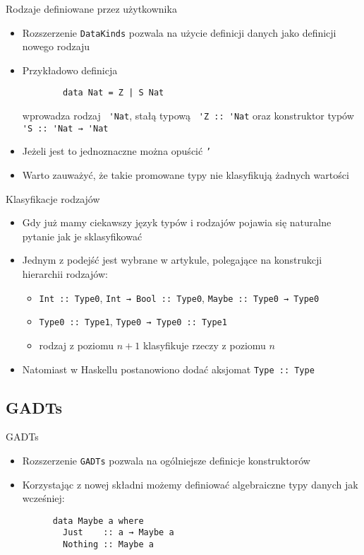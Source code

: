 \documentclass{beamer}
\begin{document}
\begin{frame}[fragile]{Rodzaje definiowane przez użytkownika}
    \begin{itemize}
      \item Rozszerzenie \lstinline!DataKinds! pozwala na użycie definicji danych jako definicji nowego rodzaju
      \item Przykładowo definicja\\
      \begin{lstlisting}
        data Nat = Z | S Nat
      \end{lstlisting}
        wprowadza rodzaj \lstinline! 'Nat!, stałą typową \lstinline! 'Z :: 'Nat! oraz konstruktor typów \lstinline! 'S :: 'Nat → 'Nat!
      \item Jeżeli jest to jednoznaczne można opuścić \texttt{'}
      \item Warto zauważyć, że takie promowane typy nie klasyfikują żadnych wartości
    \end{itemize}
\end{frame}

\begin{frame}[fragile]{Klasyfikacje rodzajów}
  \begin{itemize}
    \item Gdy już mamy ciekawszy język typów i rodzajów pojawia się naturalne pytanie jak je sklasyfikować
    \item Jednym z podejść jest wybrane w artykule, polegające na konstrukcji hierarchii rodzajów:
    \begin{itemize}
      \item \lstinline{Int :: Type0}, \lstinline{Int → Bool :: Type0}, \lstinline{Maybe :: Type0 → Type0}
      \item \lstinline{Type0 :: Type1}, \lstinline{Type0 → Type0 :: Type1}
      \item rodzaj z poziomu $n+1$ klasyfikuje rzeczy z poziomu $n$
    \end{itemize} 
    \item Natomiast w Haskellu postanowiono dodać aksjomat \lstinline{Type :: Type}
  \end{itemize}
\end{frame}

\subsection{GADTs}
\begin{frame}[fragile]{GADTs}
  \begin{itemize}
    \item Rozszerzenie \lstinline!GADTs! pozwala na ogólniejsze definicje konstruktorów
    \item Korzystając z nowej składni możemy definiować algebraiczne typy danych jak wcześniej:
    \begin{lstlisting}
      data Maybe a where
        Just    :: a → Maybe a
        Nothing :: Maybe a
    \end{lstlisting}
  \end{itemize}
\end{frame}
\end{document}
